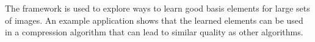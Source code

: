The framework is used to explore ways to learn good basis elements for
large sets of images. An example application shows that the learned elements
can be used in a compression algorithm that can lead to similar quality as other
algorithms.


% 
% 



